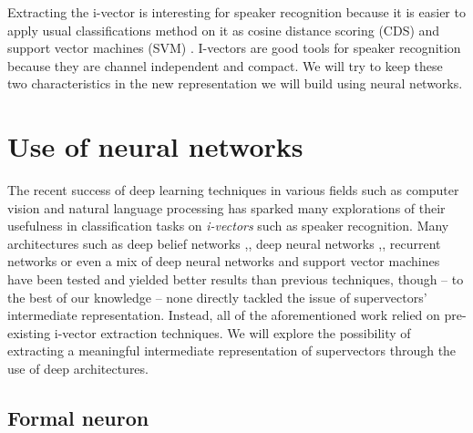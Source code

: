\documentclass[conference]{IEEEtran}
\begin{document}
Extracting the i-vector is interesting for speaker recognition because it is
easier to apply usual classifications method on it as cosine distance scoring
(CDS) and support vector machines (SVM) \cite{Senoussaoui_ani-vector,
  dehak2011front}. I-vectors are good tools for speaker recognition because they
are channel independent and compact. We will try to keep these two
characteristics in the new representation we will build using neural networks.




\section{Use of neural networks}
\label{sec:Deep}
The recent success of deep learning techniques in various fields such as
computer vision \cite{lecun1998gradient} and natural language processing \cite{bordes2012joint} has sparked
many explorations of their usefulness in classification tasks on
\emph{i-vectors} such as speaker recognition. Many architectures such as deep
belief networks \cite{DBLP:journals/corr/GhahabiH15},\cite{ghahabi2014deep},
deep neural networks \cite{DBLP:journals/corr/GhahabiH15},\cite{ghahabi2014deep}, recurrent
networks \cite{DBLP:journals/corr/SaonSRK16} or even a mix of
deep neural networks and support vector machines \cite{richardson2015deep} have been tested and yielded
better results than previous techniques, though -- to the best of our knowledge --
none directly tackled the issue of supervectors' intermediate representation.
Instead, all of the aforementioned work relied on pre-existing i-vector
extraction techniques. We will explore the possibility of extracting a
meaningful intermediate representation of supervectors through the use of deep architectures.

\subsection{Formal neuron}

\def\layersep{2cm}
\end{document}
